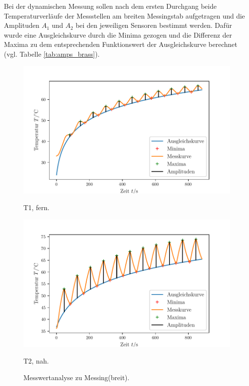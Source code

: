 Bei der dynamischen Messung sollen nach dem ersten Durchgang beide Temperaturverläufe der Messstellen am breiten Messingstab 
aufgetragen und die Amplituden $A_1$ und $A_2$ bei den jeweiligen Sensoren bestimmt werden. 
Dafür wurde eine Ausgleichskurve durch die Minima gezogen und die Differenz der Maxima zu dem entsprechenden Funktionswert
der Ausgleichskurve berechnet (vgl. Tabelle \ref{tab:amps_brass}). 
\begin{figure}
    \centering
    \begin{minipage}{.5\textwidth}
        \centering
        \includegraphics[max width=1.1\linewidth]{plots/amplitudes_brass_wide_far(t1).pdf}
        \caption{T1, fern.}
        \label{fig:plot_amps_t1}
    \end{minipage}%
    \begin{minipage}{.5\textwidth}
        \centering
        \includegraphics[max width=1.1\linewidth]{plots/amplitudes_brass_wide_close(t2).pdf}
        \caption{T2, nah.}
        \label{fig:plot_amps_t2}
    \end{minipage}
    \caption{Messwertanalyse zu Messing(breit).}
    \label{fig:plots_amps_t1_t2}
\end{figure}
